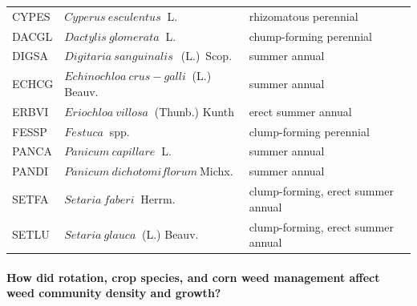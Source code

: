 \documentclass[
]{article}
\begin{document}
\begin{table}
\begin{tabular}[t]{l|l|l}
\hspace{1em}CYPES & $Cyperus~esculentus$$~$ L. & rhizomatous perennial\\
 
\hspace{1em}DACGL & $Dactylis~glomerata$$~$ L. & chump-forming perennial\\
 
\hspace{1em}DIGSA & $Digitaria~sanguinalis$$~$~(L.)~Scop. & summer annual\\
 
\hspace{1em}ECHCG & $Echinochloa~crus-galli$$~$ (L.) Beauv. & summer annual\\
 
\hspace{1em}ERBVI & $Eriochloa~villosa$$~$ (Thunb.) Kunth & erect summer annual\\
 
\hspace{1em}FESSP & $Festuca$$~$ spp. & clump-forming perennial\\
 
\hspace{1em}PANCA & $Panicum~capillare$$~$ L. & summer annual\\
 
\hspace{1em}PANDI & $Panicum~dichotomiflorum$$~$Michx. & summer annual\\
 
\hspace{1em}SETFA & $Setaria~faberi$$~$ Herrm. & clump-forming, erect summer annual\\
 
\hspace{1em}SETLU & $Setaria~glauca$$~$ (L.) Beauv. & clump-forming, erect summer annual\\
\hline
\end{tabular}
\end{table}

\hypertarget{how-did-rotation-crop-species-and-corn-weed-management-affect-weed-community-density-and-growth}{%
\paragraph*{How did rotation, crop species, and corn weed management affect weed community density and growth?}\label{how-did-rotation-crop-species-and-corn-weed-management-affect-weed-community-density-and-growth}}
\end{document}
